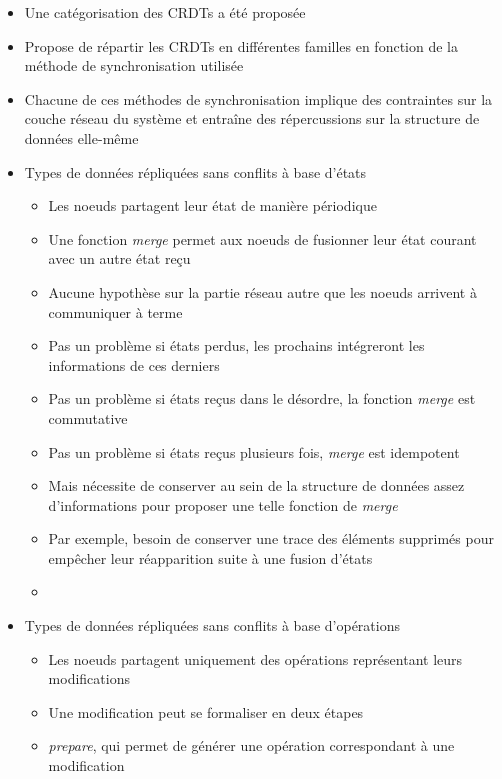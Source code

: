 \documentclass[12pt]{thesul}
\begin{document}
\begin{itemize}
  \item Une catégorisation des CRDTs a été proposée
  \item Propose de répartir les CRDTs en différentes familles en fonction de la méthode de synchronisation utilisée
  \item Chacune de ces méthodes de synchronisation implique des contraintes sur la couche réseau du système et entraîne des répercussions sur la structure de données elle-même
  \item Types de données répliquées sans conflits à base d'états \cite{shapiro_2011_crdt, shapiro:inria-00555588}
  \begin{itemize}
    \item Les noeuds partagent leur état de manière périodique
    \item Une fonction \emph{merge} permet aux noeuds de fusionner leur état courant avec un autre état reçu
    \item Aucune hypothèse sur la partie réseau autre que les noeuds arrivent à communiquer à terme
    \item Pas un problème si états perdus, les prochains intégreront les informations de ces derniers
    \item Pas un problème si états reçus dans le désordre, la fonction \emph{merge} est commutative
    \item Pas un problème si états reçus plusieurs fois, \emph{merge} est idempotent
    \item Mais nécessite de conserver au sein de la structure de données assez d'informations pour proposer une telle fonction de \emph{merge}
    \item Par exemple, besoin de conserver une trace des éléments supprimés pour empêcher leur réapparition suite à une fusion d'états
    \item {}
  \end{itemize}
  \item Types de données répliquées sans conflits à base d'opérations \cite{shapiro_2011_crdt, shapiro:inria-00555588, 2014-making-op-based-crdts-op-based, baquero2017pure}
  \begin{itemize}
    \item Les noeuds partagent uniquement des opérations représentant leurs modifications
    \item Une modification peut se formaliser en deux étapes
    \item \emph{prepare}, qui permet de générer une opération correspondant à une modification

\end{itemize}
\end{itemize}
\end{document}
